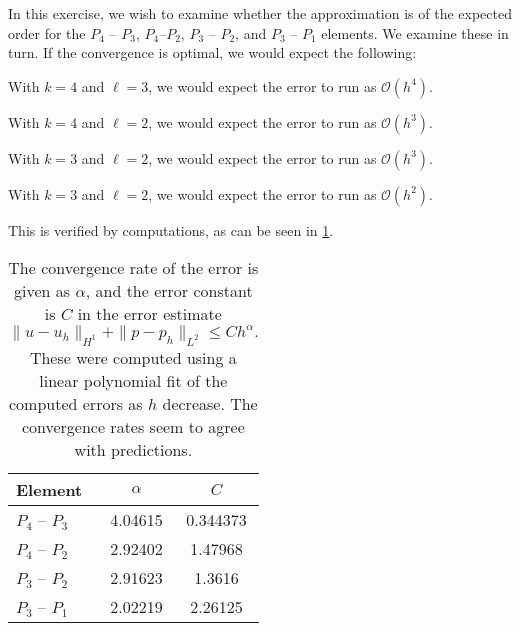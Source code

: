 \documentclass[twocolumn, article]{memoir}
\begin{document}
In this exercise, we wish to examine whether the approximation is of the
expected order for the \(P_4\) -- \(P_3\), \(P_4\)--\(P_2\), \(P_3\) --
\(P_2\), and \(P_3\) -- \(P_1\) elements. We examine these in turn.  If the
convergence is optimal, we would expect the following:
\begin{description}[wide]
    \item[\(P_4\)--\(P_3\):] 
    With \( k = 4 \) and \(\ell = 3\), we would expect the error to run as \(
    \mathcal{O}(h^4) \).

    \item[\(P_4\)--\(P_2\):]
    With \( k = 4 \) and \(\ell = 2\), we would expect the error to run as \(
    \mathcal{O}(h^3) \).

    \item[\(P_3\)--\(P_2\):]
    With \( k = 3 \) and \(\ell = 2\), we would expect the error to run as \(
    \mathcal{O}(h^3) \).

    \item[\(P_3\)--\(P_1\):]
    With \( k = 3 \) and \(\ell = 2\), we would expect the error to run as \(
    \mathcal{O}(h^2) \).
\end{description}
This is verified by computations, as can be seen in
\cref{tab:approximation_order_7_6}. 

\begin{table}[htpb]
    \centering
    \caption{The convergence rate of the error is given as \( \alpha \), and
        the error constant is \( C \) in the error estimate \[ \| u -
        u_h\|_{H^1} + \| p - p_h \|_{L^2} \leq Ch^\alpha.\] These were computed
        using a linear polynomial fit of the computed errors as \( h \)
        decrease. The convergence rates seem to agree with predictions.}
    \label{tab:approximation_order_7_6}
    \begin{tabular}{lcc}
    \toprule
    {Element} & \( \alpha \) & \(C\) \\
    \midrule
    \(P_4\) -- \(P_3\) &          4.04615 &    0.344373 \\
    \(P_4\) -- \(P_2\) &          2.92402 &     1.47968 \\
    \(P_3\) -- \(P_2\) &          2.91623 &      1.3616 \\
    \(P_3\) -- \(P_1\) &          2.02219 &     2.26125 \\
    \bottomrule
    \end{tabular}
\end{table}
\end{document}

